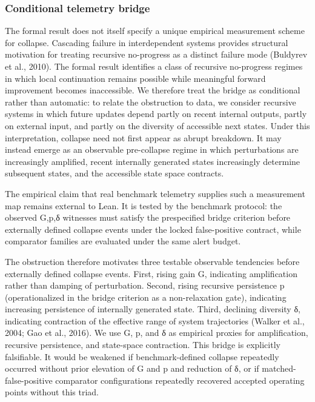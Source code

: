 \documentclass[
  11pt,
]{article}
\begin{document}
\subsubsection{Conditional telemetry
bridge}\label{conditional-telemetry-bridge}

The formal result does not itself specify a unique empirical measurement
scheme for collapse. Cascading failure in interdependent systems
provides structural motivation for treating recursive no-progress as a
distinct failure mode (Buldyrev et al., 2010). The formal result
identifies a class of recursive no-progress regimes in which local
continuation remains possible while meaningful forward improvement
becomes inaccessible. We therefore treat the bridge as conditional
rather than automatic: to relate the obstruction to data, we consider
recursive systems in which future updates depend partly on recent
internal outputs, partly on external input, and partly on the diversity
of accessible next states. Under this interpretation, collapse need not
first appear as abrupt breakdown. It may instead emerge as an observable
pre-collapse regime in which perturbations are increasingly amplified,
recent internally generated states increasingly determine subsequent
states, and the accessible state space contracts.

The empirical claim that real benchmark telemetry supplies such a
measurement map remains external to Lean. It is tested by the benchmark
protocol: the observed G,p,δ witnesses must satisfy the prespecified
bridge criterion before externally defined collapse events under the
locked false-positive contract, while comparator families are evaluated
under the same alert budget.

The obstruction therefore motivates three testable observable tendencies
before externally defined collapse events. First, rising gain G,
indicating amplification rather than damping of perturbation. Second,
rising recursive persistence p (operationalized in the bridge criterion
as a non-relaxation gate), indicating increasing persistence of
internally generated state. Third, declining diversity δ, indicating
contraction of the effective range of system trajectories (Walker et
al., 2004; Gao et al., 2016). We use G, p, and δ as empirical proxies
for amplification, recursive persistence, and state-space contraction.
This bridge is explicitly falsifiable. It would be weakened if
benchmark-defined collapse repeatedly occurred without prior elevation
of G and p and reduction of δ, or if matched-false-positive comparator
configurations repeatedly recovered accepted operating points without
this triad.
\end{document}
